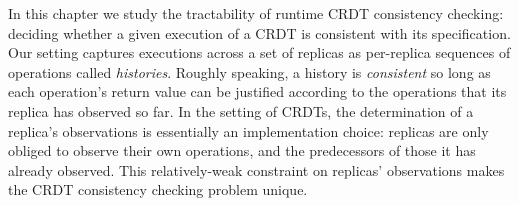 


In this chapter we study the tractability of runtime CRDT consistency checking: deciding whether a given execution of a CRDT is consistent with its specification. 
Our setting captures executions across a set of replicas as per-replica sequences of operations called \emph{histories}. Roughly speaking, a history is \emph{consistent} so long as each operation’s return value can be justified according to the operations that its replica has observed so far. In the setting of CRDTs, the determination of a replica’s observations is essentially an implementation choice: replicas are only obliged to observe their own operations, and the predecessors of those it has already observed. This relatively-weak constraint on replicas’ observations makes the CRDT consistency checking problem unique.

%  

